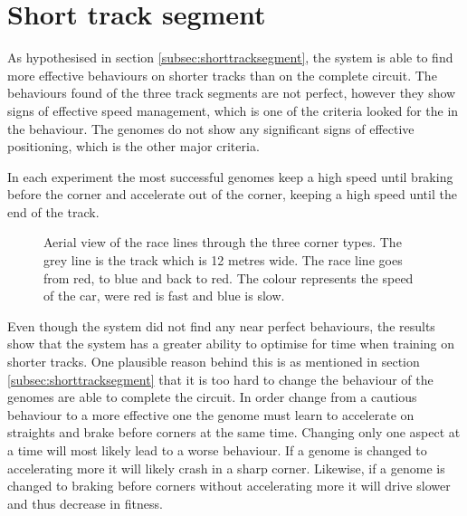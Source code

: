 
\section{Short track segment}
\label{result:short}
As hypothesised in section \ref{subsec:shorttracksegment}, the system is able to find more effective behaviours on shorter tracks than on the complete circuit. The behaviours found of the three track segments are not perfect, however they show signs of effective speed management, which is one of the criteria looked for the in the behaviour. The genomes do not show any significant signs of effective positioning, which is the other major criteria. 

In each experiment the most successful genomes keep a high speed until braking before the corner and accelerate out of the corner, keeping a high speed until the end of the track. 

\begin{figure}[H]
    \centering
    \qquad
    \qquad

    \caption{Aerial view of the race lines through the three corner types. The grey line is the track which is 12 metres wide. The race line goes from red, to blue and back to red. The colour represents the speed of the car, were red is fast and blue is slow.}
\end{figure}

Even though the system did not find any near perfect behaviours, the results show that the system has a greater ability to optimise for time when training on shorter tracks. One plausible reason behind this is as mentioned in section \ref{subsec:shorttracksegment} that it is too hard to change the behaviour of the genomes are able to complete the circuit. In order change from a cautious behaviour to a more effective one the genome must learn to accelerate on straights and brake before corners at the same time. Changing only one aspect at a time will most likely lead to a worse behaviour. If a genome is changed to accelerating more it will likely crash in a sharp corner. Likewise, if a genome is changed to braking before corners without accelerating more it will drive slower and thus decrease in fitness.  

